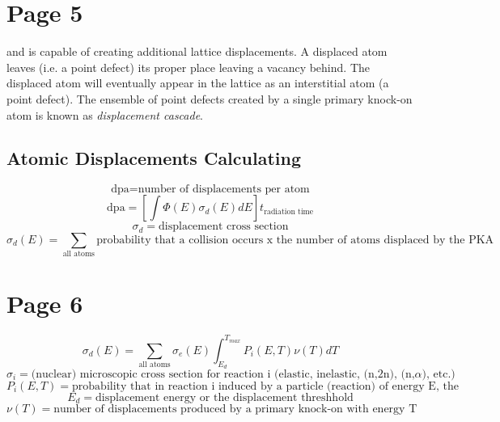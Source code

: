 \documentclass[11pt]{article}
\begin{document}
\section{Page 5}
and is capable of creating additional lattice displacements. A displaced atom leaves (i.e. a point defect) its proper place leaving a vacancy behind. The displaced atom will eventually appear in the lattice as an interstitial atom (a point defect). The ensemble of point defects created by a single primary knock-on atom is known as \textit{displacement cascade}.

\subsection{Atomic Displacements Calculating}
\begin{equation}
	\text{dpa} = \text{number of displacements per atom}
\end{equation}
\begin{equation}
	\text{dpa} = \left[ \int \Phi(E) \sigma_d (E) dE \right] t_{\text{radiation time}}
\end{equation}
\begin{equation}
	\sigma_d = \text{displacement cross section}
\end{equation}
\begin{equation}
	\sigma_d(E) = \sum_{\text{all atoms}} \text{probability that a collision occurs x the number of atoms displaced by the PKA}
\end{equation}

\section{Page 6}
\begin{equation}
	\sigma_d(E) = \sum_{\text{all atoms}} \sigma_e (E) \int_{E_d}^{T_{max}} P_i(E,T) \nu(T) dT
\end{equation}
\begin{equation}
	\sigma_i = \text{(nuclear) microscopic cross section for reaction i (elastic, inelastic, (n,2n), (n,$\alpha$), etc.)}
\end{equation}
\begin{equation}
	P_i(E,T) = \text{probability that in reaction i induced by a particle (reaction) of energy E, the PKA has a kinetic energy T}
\end{equation}
\begin{equation}
	E_d = \text{displacement energy or the displacement threshhold}
\end{equation}
\begin{equation}
	\nu(T) = \text{number of displacements produced by a primary knock-on with energy T}
\end{equation}
\end{document}

